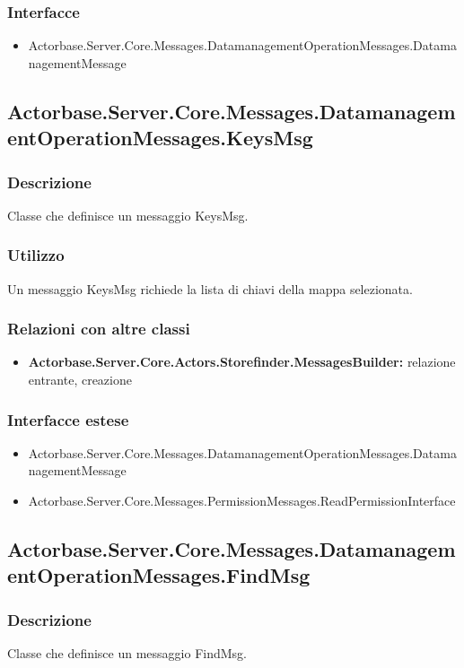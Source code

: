 \documentclass[a4paper]{article}
\begin{document}
			\subsubsection{Interfacce}
			\begin{itemize}
				\item Actorbase.Server.Core.Messages.DatamanagementOperationMessages.DatamanagementMessage
			\end{itemize}

			\subsection{Actorbase.Server.Core.Messages.DatamanagementOperationMessages.KeysMsg}
			\subsubsection{Descrizione}
				Classe che definisce un messaggio KeysMsg.
			\subsubsection{Utilizzo}
				Un messaggio KeysMsg richiede la lista di chiavi della mappa selezionata.
			\subsubsection{Relazioni con altre classi}
			\begin{itemize}
				\item \textbf{Actorbase.Server.Core.Actors.Storefinder.MessagesBuilder:} relazione entrante, creazione
			\end{itemize}
			\subsubsection{Interfacce estese}
			\begin{itemize}
				\item Actorbase.Server.Core.Messages.DatamanagementOperationMessages.DatamanagementMessage
				\item Actorbase.Server.Core.Messages.PermissionMessages.ReadPermissionInterface
			\end{itemize}

			\subsection{Actorbase.Server.Core.Messages.DatamanagementOperationMessages.FindMsg}
			\subsubsection{Descrizione}
				Classe che definisce un messaggio FindMsg.
\end{document}
